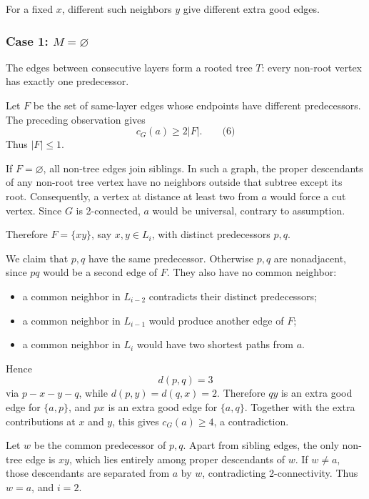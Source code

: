 \documentclass[
  11pt,
  a4paper,
]{article}
\providecommand{\tightlist}{%
  \setlength{\itemsep}{0pt}\setlength{\parskip}{0pt}}
\begin{document}
For a fixed \(x\), different such neighbors \(y\) give different extra
good edges.

\subsubsection{\texorpdfstring{Case 1:
\(M=\varnothing\)}{Case 1: M=\textbackslash varnothing}}\label{case-1-mvarnothing}

The edges between consecutive layers form a rooted tree \(T\): every
non-root vertex has exactly one predecessor.

Let \(F\) be the set of same-layer edges whose endpoints have different
predecessors. The preceding observation gives \[
c_G(a)\ge 2|F|.
\qquad\text{(6)}
\] Thus \(|F|\le1\).

If \(F=\varnothing\), all non-tree edges join siblings. In such a graph,
the proper descendants of any non-root tree vertex have no neighbors
outside that subtree except its root. Consequently, a vertex at distance
at least two from \(a\) would force a cut vertex. Since \(G\) is
2-connected, \(a\) would be universal, contrary to assumption.

Therefore \(F=\{xy\}\), say \(x,y\in L_i\), with distinct predecessors
\(p,q\).

We claim that \(p,q\) have the same predecessor. Otherwise \(p,q\) are
nonadjacent, since \(pq\) would be a second edge of \(F\). They also
have no common neighbor:

\begin{itemize}
\tightlist
\item
  a common neighbor in \(L_{i-2}\) contradicts their distinct
  predecessors;
\item
  a common neighbor in \(L_{i-1}\) would produce another edge of \(F\);
\item
  a common neighbor in \(L_i\) would have two shortest paths from \(a\).
\end{itemize}

Hence \[
d(p,q)=3
\] via \(p-x-y-q\), while \(d(p,y)=d(q,x)=2\). Therefore \(qy\) is an
extra good edge for \(\{a,p\}\), and \(px\) is an extra good edge for
\(\{a,q\}\). Together with the extra contributions at \(x\) and \(y\),
this gives \(c_G(a)\ge4\), a contradiction.

Let \(w\) be the common predecessor of \(p,q\). Apart from sibling
edges, the only non-tree edge is \(xy\), which lies entirely among
proper descendants of \(w\). If \(w\ne a\), those descendants are
separated from \(a\) by \(w\), contradicting 2-connectivity. Thus
\(w=a\), and \(i=2\).
\end{document}

